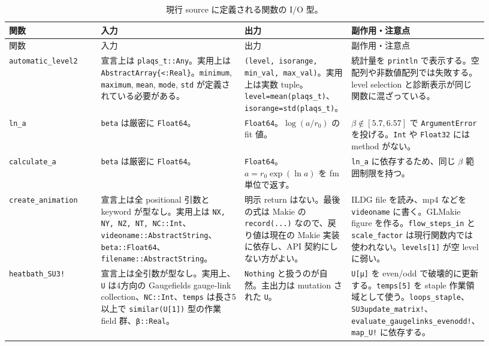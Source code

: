 \documentclass[uplatex,dvipdfmx,ja=standard,11pt,a4paper]{bxjsarticle}
\newcommand{\code}[1]{\texttt{#1}}
\begin{document}
{\footnotesize
\begin{longtable}{>{\raggedright\arraybackslash}p{0.20\linewidth}>{\raggedright\arraybackslash}p{0.31\linewidth}>{\raggedright\arraybackslash}p{0.21\linewidth}>{\raggedright\arraybackslash}p{0.21\linewidth}}
\caption{現行 source に定義される関数の I/O 型。}\label{tab:function-io}\\
\toprule
関数 & 入力 & 出力 & 副作用・注意点 \\
\midrule
\endfirsthead
\toprule
関数 & 入力 & 出力 & 副作用・注意点 \\
\midrule
\endhead
\code{automatic\_level2} & 宣言上は \code{plaqs\_t::Any}。実用上は \code{AbstractArray\{<:Real\}}。\code{minimum}, \code{maximum}, \code{mean}, \code{mode}, \code{std} が定義されている必要がある。 & \code{(level, isorange, min\_val, max\_val)}。実用上は実数 tuple。\code{level=mean(plaqs\_t)}、\code{isorange=std(plaqs\_t)}。 & 統計量を \code{println} で表示する。空配列や非数値配列では失敗する。level selection と診断表示が同じ関数に混ざっている。 \\
\code{ln\_a} & \code{beta} は厳密に \code{Float64}。 & \code{Float64}。\(\log(a/r_0)\) の fit 値。 & \(\beta\notin[5.7,6.57]\) で \code{ArgumentError} を投げる。\code{Int} や \code{Float32} には method がない。 \\
\code{calculate\_a} & \code{beta} は厳密に \code{Float64}。 & \code{Float64}。\(a=r_0\exp(\ln a)\) を fm 単位で返す。 & \code{ln\_a} に依存するため、同じ \(\beta\) 範囲制限を持つ。 \\
\code{create\_animation} & 宣言上は全 positional 引数と keyword が型なし。実用上は \code{NX, NY, NZ, NT, NC::Int}、\code{videoname::AbstractString}、\code{beta::Float64}、\code{filename::AbstractString}。 & 明示 return はない。最後の式は Makie の \code{record(...)} なので、戻り値は現在の Makie 実装に依存し、API 契約にしない方がよい。 & ILDG file を読み、mp4 などを \code{videoname} に書く。GLMakie figure を作る。\code{flow\_steps\_in} と \code{scale\_factor} は現行関数内では使われない。\code{levels[1]} が空 level に弱い。 \\
\code{heatbath\_SU3!} & 宣言上は全引数が型なし。実用上、\code{U} は4方向の Gaugefields gauge-link collection、\code{NC::Int}、\code{temps} は長さ5以上で \code{similar(U[1])} 型の作業 field 群、\code{β::Real}。 & \code{Nothing} と扱うのが自然。主出力は mutation された \code{U}。 & \code{U[μ]} を even/odd で破壊的に更新する。\code{temps[5]} を staple 作業領域として使う。\code{loops\_staple}、\code{SU3update\_matrix!}、\code{evaluate\_gaugelinks\_evenodd!}、\code{map\_U!} に依存する。 \\

\end{longtable}}
\end{document}
